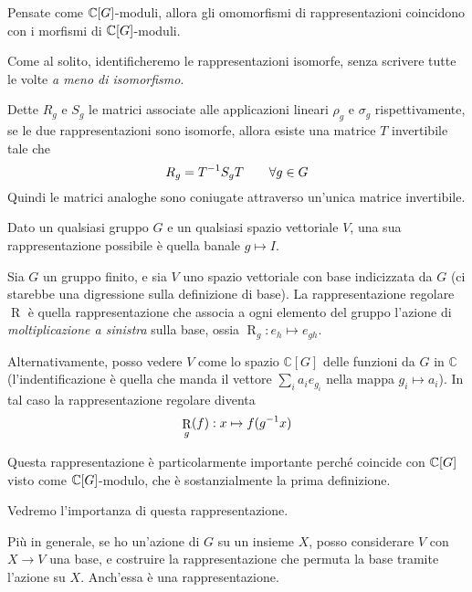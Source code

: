 \documentclass[a4paper,10pt,oneside]{math_article}
\newcommand{\id}{I}
\DeclareMathOperator{\Reg}{R}
\begin{document}
    Pensate come $\mathbb C[G]$-moduli, allora gli omomorfismi di rappresentazioni coincidono con i morfismi di $\mathbb C[G]$-moduli.
    
    Come al solito, identificheremo le rappresentazioni isomorfe, senza scrivere tutte le volte \emph{a meno di isomorfismo}.
    
    Dette $R_g$ e $S_g$ le matrici associate alle applicazioni lineari $\rho_g$ e $\sigma_g$ rispettivamente, se le due rappresentazioni sono isomorfe, allora esiste una matrice $T$ invertibile tale che
    \[
     R_g = T^{-1} S_g T \qquad \forall g\in G
    \]
    Quindi le matrici analoghe sono coniugate attraverso un'unica matrice invertibile.
        
    \begin{myexample}
     Dato un qualsiasi gruppo $G$ e un qualsiasi spazio vettoriale $V$, una sua rappresentazione possibile è quella banale $g \mapsto \id$.
    \end{myexample}
    \begin{myexample}
     Sia $G$ un gruppo finito, e sia $V$ uno spazio vettoriale con base indicizzata da $G$ (ci starebbe una digressione sulla definizione di base). La rappresentazione regolare $\Reg$ è quella rappresentazione che associa a ogni elemento del gruppo l'azione di \emph{moltiplicazione a sinistra} sulla base, ossia $\Reg_g: e_h \mapsto e_{gh}$.
     
     Alternativamente, posso vedere $V$ come lo spazio $\mathbb C[G]$ delle funzioni da $G$ in $\mathbb C$ (l'indentificazione è quella che manda il vettore $\sum_i a_ie_{g_i}$ nella mappa $g_i \mapsto a_i$). In tal caso la rappresentazione regolare diventa
     \[
     \Reg_g(f): x \mapsto  f ( g\inv x) 
     \]
     
     Questa rappresentazione è particolarmente importante perché coincide con $\mathbb C[G]$ visto come $\mathbb C[G]$-modulo, che è sostanzialmente la prima definizione.
     
     Vedremo l'importanza di questa rappresentazione.
     \end{myexample}
     \begin{myexample}
      Più in generale, se ho un'azione di $G$ su un insieme $X$, posso considerare $V$ con $X\rightarrow V$ una base, e costruire la rappresentazione che permuta la base tramite l'azione su $X$. Anch'essa è una rappresentazione.
    \end{myexample}
  
\end{document}
